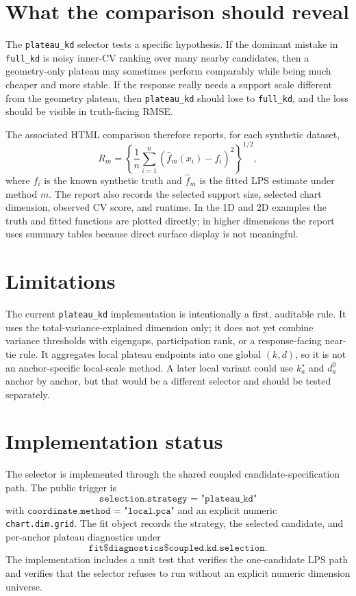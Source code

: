 \documentclass[11pt]{article}
\newcommand{\code}[1]{\texttt{#1}}
\begin{document}
\section{What the comparison should reveal}

The \code{plateau\_kd} selector tests a specific hypothesis.  If the dominant
mistake in \code{full\_kd} is noisy inner-CV ranking over many nearby
candidates, then a geometry-only plateau may sometimes perform comparably while
being much cheaper and more stable.  If the response really needs a support
scale different from the geometry plateau, then \code{plateau\_kd} should lose
to \code{full\_kd}, and the loss should be visible in truth-facing RMSE.

The associated HTML comparison therefore reports, for each synthetic dataset,
\[
  R_m
  =
  \left\{
  \frac{1}{n}\sum_{i=1}^n
  \left(\widehat f_m(x_i)-f_i\right)^2
  \right\}^{1/2},
\]
where \(f_i\) is the known synthetic truth and \(\widehat f_m\) is the fitted
LPS estimate under method \(m\).  The report also records the selected support
size, selected chart dimension, observed CV score, and runtime.  In the 1D and
2D examples the truth and fitted functions are plotted directly; in higher
dimensions the report uses summary tables because direct surface display is not
meaningful.

\section{Limitations}

The current \code{plateau\_kd} implementation is intentionally a first,
auditable rule.  It uses the total-variance-explained dimension only; it does
not yet combine variance thresholds with eigengaps, participation rank, or a
response-facing near-tie rule.  It aggregates local plateau endpoints into one
global \((k,d)\), so it is not an anchor-specific local-scale method.  A later
local variant could use \(k_a^\star\) and \(d_a^0\) anchor by anchor, but that
would be a different selector and should be tested separately.

\section{Implementation status}

The selector is implemented through the shared coupled candidate-specification
path.  The public trigger is
\[
  \code{selection.strategy = "plateau\_kd"}
\]
with \(\code{coordinate.method = "local.pca"}\) and an explicit numeric
\code{chart.dim.grid}.  The fit object records the strategy, the selected
candidate, and per-anchor plateau diagnostics under
\[
  \code{fit\$diagnostics\$coupled.kd.selection}.
\]
The implementation includes a unit test that verifies the one-candidate LPS path
and verifies that the selector refuses to run without an explicit numeric
dimension universe.
\end{document}
